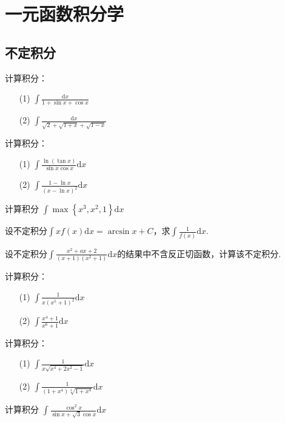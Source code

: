 \chapter{一元函数积分学}\label{cha:3}
\section{不定积分}
\begin{xiti}
	\item 计算积分：
	\begin{enumerate}
		\item[(1)] $\int \frac {\mathrm{d}x } { 1 + \sin x + \cos x }$
		\item[(2)]  $\int \frac { \mathrm { d } x } { \sqrt { 2 } + \sqrt { 1 + x } + \sqrt { 1 - x } }$
	\end{enumerate}	
		\item 计算积分：
	\begin{enumerate}
		\item[(1)] $\int \frac { \ln ( \tan x ) } { \sin x \cos x } \mathrm { d } x$
		\item[(2)]  $\int \frac { 1 - \ln x } { ( x - \ln x ) ^ { 2 } }\mathrm{d}x$
	\end{enumerate}	
	\item 计算积分 $\int \max \left\{ x ^ { 3 } , x ^ { 2 } , 1 \right\} \mathrm { d } x$
	\item 设不定积分$\int x f ( x ) \mathrm { d } x = \arcsin x + C$，求$\int \frac { 1 } { f ( x ) } \mathrm { d } x$.
	\item 设不定积分$\int \frac { x ^ { 2 } + a x + 2 } { ( x + 1 ) \left( x ^ { 2 } + 1 \right) }\mathrm{d}x$的结果中不含反正切函数，计算该不定积分.
	\item 计算积分：
	\begin{enumerate}
		\item[(1)] $\int \frac { 1 } { x \left( x ^ { 5 } + 1 \right) ^ { 2 } }\mathrm{d}x$
		\item[(2)]  $\int \frac { x ^ { 4 } + 1 } { x ^ { 6 } + 1 }\mathrm{d}x$
	\end{enumerate}	
\item 计算积分：
\begin{enumerate}
	\item[(1)] $\int \frac { 1 } { x \sqrt { x ^ { 4 } + 2 x ^ { 2 } - 1 } } \mathrm { d } x$
	\item[(2)]  $\int \frac { 1 } { \left( 1 + x ^ { 4 } \right) \sqrt [ 4 ] { 1 + x ^ { 4 } } } \mathrm { d } x$
\end{enumerate}	
\item 计算积分
$\int \frac { \cos ^ { 2 } x } { \sin x + \sqrt { 3 } \cos x }\mathrm{d}x$


\end{xiti}
